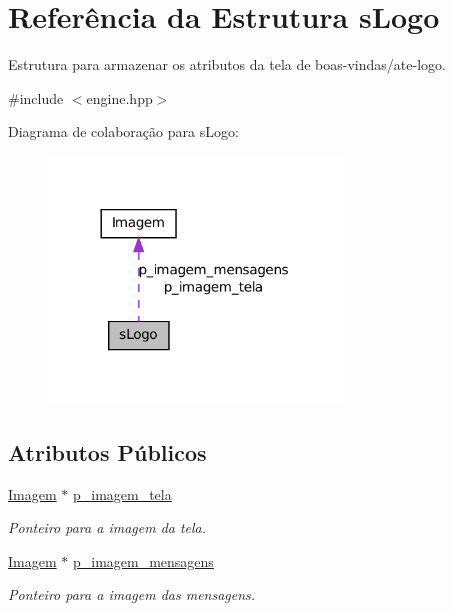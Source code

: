 \hypertarget{structsLogo}{
\section{Referência da Estrutura sLogo}
\label{structsLogo}
}


Estrutura para armazenar os atributos da tela de boas-\/vindas/ate-\/logo.  




{\ttfamily \#include $<$engine.hpp$>$}



Diagrama de colaboração para sLogo:\nopagebreak
\begin{figure}[H]
\begin{center}
\leavevmode
\includegraphics[width=221pt]{structsLogo__coll__graph}
\end{center}
\end{figure}
\subsection*{Atributos Públicos}
\begin{DoxyCompactItemize}
\item 
\hypertarget{structsLogo_a2052acc41dd97ec0385a81ff66baf53f}{
\hyperlink{classImagem}{Imagem} $\ast$ \hyperlink{structsLogo_a2052acc41dd97ec0385a81ff66baf53f}{p\_\-imagem\_\-tela}}
\label{structsLogo_a2052acc41dd97ec0385a81ff66baf53f}

\begin{DoxyCompactList}\small\item\em Ponteiro para a imagem da tela. \item\end{DoxyCompactList}\item 
\hypertarget{structsLogo_a60588aa6ebc948935943dcdc00906efc}{
\hyperlink{classImagem}{Imagem} $\ast$ \hyperlink{structsLogo_a60588aa6ebc948935943dcdc00906efc}{p\_\-imagem\_\-mensagens}}
\label{structsLogo_a60588aa6ebc948935943dcdc00906efc}

\begin{DoxyCompactList}\small\item\em Ponteiro para a imagem das mensagens. \item\end{DoxyCompactList}\end{DoxyCompactItemize}


